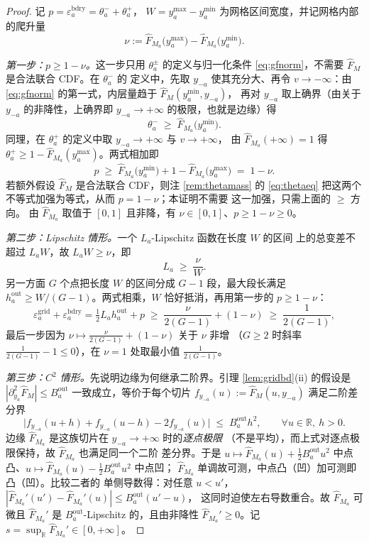 \documentclass[a4paper,11pt]{article}
\theoremstyle{definition}
\newcommand{\R}{\mathbb R}
\newcommand{\1}{\mathbf 1}
\begin{document}
\begin{proof}
记 $p=\varepsilon_a^{\mathrm{bdry}}=\theta_a^-+\theta_a^+$，
$W=y_a^{\max}-y_a^{\min}$ 为网格区间宽度，并记网格内部的爬升量
\[
\nu:=\widehat F_{M_a}\bigl(y_a^{\max}\bigr)
-\widehat F_{M_a}\bigl(y_a^{\min}\bigr) .
\]

\emph{第一步：$p\ge1-\nu$。}这一步只用 $\theta_a^{\pm}$ 的定义与归一化条件
\eqref{eq:gfnorm}，不需要 $\widehat F_M$ 是合法联合 CDF。在 $\theta_a^-$ 的
定义中，先取 $y_{-a}$ 使其充分大、再令 $v\to-\infty$：由
\eqref{eq:gfnorm} 的第一式，内层量趋于 $\widehat F_M(y_a^{\min},y_{-a})$，
再对 $y_{-a}$ 取上确界（由关于 $y_{-a}$ 的非降性，上确界即
$y_{-a}\to+\infty$ 的极限，也就是边缘）得
\[
\theta_a^-\;\ge\;\widehat F_{M_a}\bigl(y_a^{\min}\bigr) .
\]
同理，在 $\theta_a^+$ 的定义中取 $y_{-a}\to+\infty$ 与 $v\to+\infty$，
由 $\widehat F_{M_a}(+\infty)=1$ 得
$\theta_a^+\ge1-\widehat F_{M_a}(y_a^{\max})$。两式相加即
\[
p\;\ge\;\widehat F_{M_a}\bigl(y_a^{\min}\bigr)
+1-\widehat F_{M_a}\bigl(y_a^{\max}\bigr)
\;=\;1-\nu .
\]
若额外假设 $\widehat F_M$ 是合法联合 CDF，则注 \ref{rem:thetamass} 的
\eqref{eq:thetaeq} 把这两个不等式加强为等式，从而 $p=1-\nu$；本证明不需要
这一加强，只需上面的 $\ge$ 方向。
由 $\widehat F_{M_a}$ 取值于 $[0,1]$ 且非降，有 $\nu\in[0,1]$、$p\ge1-\nu\ge0$。

\emph{第二步：Lipschitz 情形。}一个 $L_a$-Lipschitz 函数在长度 $W$ 的区间
上的总变差不超过 $L_aW$，故 $L_aW\ge\nu$，即
\[
L_a\;\ge\;\frac{\nu}{W} .
\]
另一方面 $G$ 个点把长度 $W$ 的区间分成 $G-1$ 段，最大段长满足
$h_a^{\mathrm{out}}\ge W/(G-1)$。两式相乘，$W$ 恰好抵消，再用第一步的
$p\ge1-\nu$：
\[
\varepsilon_a^{\mathrm{grid}}+\varepsilon_a^{\mathrm{bdry}}
=\tfrac12L_ah_a^{\mathrm{out}}+p
\;\ge\;
\frac{\nu}{2(G-1)}+(1-\nu)
\;\ge\;
\frac{1}{2(G-1)},
\]
最后一步因为 $\nu\mapsto\frac{\nu}{2(G-1)}+(1-\nu)$ 关于 $\nu$ 非增
（$G\ge2$ 时斜率 $\frac{1}{2(G-1)}-1\le0$），在 $\nu=1$ 处取最小值
$\frac{1}{2(G-1)}$。

\emph{第三步：$C^2$ 情形。}先说明边缘为何继承二阶界。引理
\ref{lem:gridbd}(ii) 的假设是 $|\partial_{y_a}^2\widehat F_M|\le
B_a^{\mathrm{out}}$ 一致成立，等价于每个切片
$f_{y_{-a}}(u):=\widehat F_M(u,y_{-a})$ 满足二阶差分界
\[
\bigl|f_{y_{-a}}(u+h)+f_{y_{-a}}(u-h)-2f_{y_{-a}}(u)\bigr|
\;\le\;B_a^{\mathrm{out}}h^2,
\qquad\forall u\in\R,\ h>0 .
\]
边缘 $\widehat F_{M_a}$ 是这族切片在 $y_{-a}\to+\infty$ 时的\emph{逐点极限}
（不是平均），而上式对逐点极限保持，故 $\widehat F_{M_a}$ 也满足同一个二阶
差分界。于是 $u\mapsto\widehat F_{M_a}(u)+\tfrac12B_a^{\mathrm{out}}u^2$
中点凸、$u\mapsto\widehat F_{M_a}(u)-\tfrac12B_a^{\mathrm{out}}u^2$ 中点凹；
$\widehat F_{M_a}$ 单调故可测，中点凸（凹）加可测即凸（凹）。比较二者的
单侧导数得：对任意 $u<u'$，
$|\widehat F_{M_a}'(u')-\widehat F_{M_a}'(u)|\le B_a^{\mathrm{out}}(u'-u)$，
这同时迫使左右导数重合。故 $\widehat F_{M_a}$ 可微且
$\widehat F_{M_a}'$ 是 $B_a^{\mathrm{out}}$-Lipschitz 的，且由非降性
$\widehat F_{M_a}'\ge0$。记 $s=\sup_{\R}\widehat F_{M_a}'\in[0,+\infty]$。


\end{proof}
\end{document}
